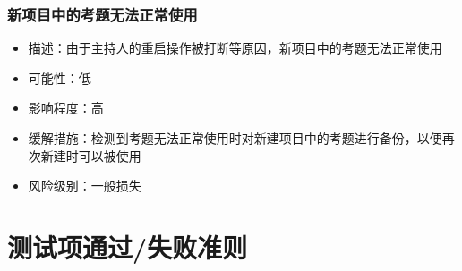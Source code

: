 \documentclass[hyperref, a4paper]{ctexart}
\providecommand{\tightlist}{%
  \setlength{\itemsep}{0pt}\setlength{\parskip}{0pt}}
\begin{document}
\hypertarget{ux65b0ux9879ux76eeux4e2dux7684ux8003ux9898ux65e0ux6cd5ux6b63ux5e38ux4f7fux7528}{%
\subsubsection{新项目中的考题无法正常使用}\label{ux65b0ux9879ux76eeux4e2dux7684ux8003ux9898ux65e0ux6cd5ux6b63ux5e38ux4f7fux7528}}

\begin{itemize}
\tightlist
\item
  描述：由于主持人的重启操作被打断等原因，新项目中的考题无法正常使用
\item
  可能性：低
\item
  影响程度：高
\item
  缓解措施：检测到考题无法正常使用时对新建项目中的考题进行备份，以便再次新建时可以被使用
\item
  风险级别：一般损失
\end{itemize}

\hypertarget{ux6d4bux8bd5ux9879ux901aux8fc7ux5931ux8d25ux51c6ux5219}{%
\section{测试项通过/失败准则}\label{ux6d4bux8bd5ux9879ux901aux8fc7ux5931ux8d25ux51c6ux5219}}
\end{document}

